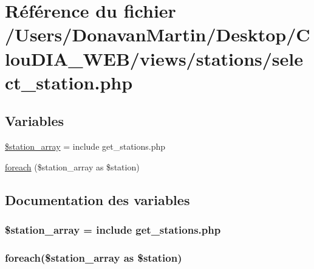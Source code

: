 \hypertarget{select__station_8php}{}\section{Référence du fichier /\+Users/\+Donavan\+Martin/\+Desktop/\+Clou\+D\+I\+A\+\_\+\+W\+E\+B/views/stations/select\+\_\+station.php}
\label{select__station_8php}
\subsection*{Variables}
\begin{DoxyCompactItemize}
\item 
\hyperlink{select__station_8php_a6b6ea12a71349100a8fbf4d59371073c}{\$station\+\_\+array} = include \textquotesingle{}get\+\_\+stations.\+php\textquotesingle{}
\item 
\hyperlink{select__station_8php_a14084dddbf32d44bf294e2a80dbef6ac}{foreach} (\$station\+\_\+array as \$station)
\end{DoxyCompactItemize}


\subsection{Documentation des variables}
\hypertarget{select__station_8php_a6b6ea12a71349100a8fbf4d59371073c}{}
\subsubsection[{\$station\+\_\+array}]{\setlength{\rightskip}{0pt plus 5cm}\$station\+\_\+array = include \textquotesingle{}get\+\_\+stations.\+php\textquotesingle{}}\label{select__station_8php_a6b6ea12a71349100a8fbf4d59371073c}
\hypertarget{select__station_8php_a14084dddbf32d44bf294e2a80dbef6ac}{}
\subsubsection[{foreach}]{\setlength{\rightskip}{0pt plus 5cm}foreach(\$station\+\_\+array as \$station)}\label{select__station_8php_a14084dddbf32d44bf294e2a80dbef6ac}
